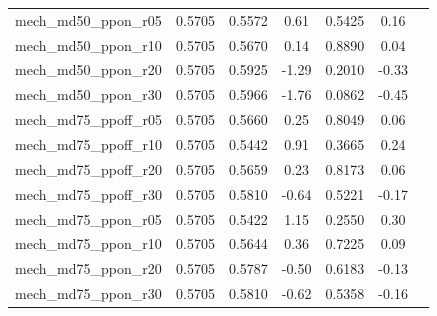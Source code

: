 \begin{table}[htbp]
\begin{tabular}{lcccccc}
  mech\_md50\_ppon\_r05 & 0.5705 & 0.5572 & 0.61 & 0.5425 & 0.16 &  \\
  mech\_md50\_ppon\_r10 & 0.5705 & 0.5670 & 0.14 & 0.8890 & 0.04 &  \\
  mech\_md50\_ppon\_r20 & 0.5705 & 0.5925 & -1.29 & 0.2010 & -0.33 &  \\
  mech\_md50\_ppon\_r30 & 0.5705 & 0.5966 & -1.76 & 0.0862 & -0.45 &  \\
  mech\_md75\_ppoff\_r05 & 0.5705 & 0.5660 & 0.25 & 0.8049 & 0.06 &  \\
  mech\_md75\_ppoff\_r10 & 0.5705 & 0.5442 & 0.91 & 0.3665 & 0.24 &  \\
  mech\_md75\_ppoff\_r20 & 0.5705 & 0.5659 & 0.23 & 0.8173 & 0.06 &  \\
  mech\_md75\_ppoff\_r30 & 0.5705 & 0.5810 & -0.64 & 0.5221 & -0.17 &  \\
  mech\_md75\_ppon\_r05 & 0.5705 & 0.5422 & 1.15 & 0.2550 & 0.30 &  \\
  mech\_md75\_ppon\_r10 & 0.5705 & 0.5644 & 0.36 & 0.7225 & 0.09 &  \\
  mech\_md75\_ppon\_r20 & 0.5705 & 0.5787 & -0.50 & 0.6183 & -0.13 &  \\
  mech\_md75\_ppon\_r30 & 0.5705 & 0.5810 & -0.62 & 0.5358 & -0.16 &  \\
\bottomrule
\end{tabular}
\end{table}